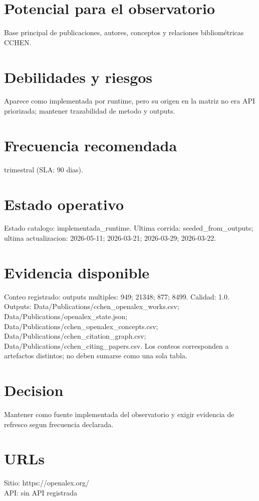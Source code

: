 \documentclass[10pt,a4paper]{article}
\begin{document}
\section*{Potencial para el observatorio}
Base principal de publicaciones, autores, conceptos y relaciones bibliométricas CCHEN.

\section*{Debilidades y riesgos}
Aparece como implementada por runtime, pero su origen en la matriz no era API priorizada; mantener trazabilidad de metodo y outputs.

\section*{Frecuencia recomendada}
trimestral (SLA: 90 dias).

\section*{Estado operativo}
Estado catalogo: implementada\_runtime. Ultima corrida: seeded\_from\_outputs; ultima actualizacion: 2026-05-11; 2026-03-21; 2026-03-29; 2026-03-22.

\section*{Evidencia disponible}
Conteo registrado: outputs multiples: 949; 21348; 877; 8499. Calidad: 1.0. Outputs: Data/Publications/cchen\_openalex\_works.csv; Data/Publications/openalex\_state.json; Data/Publications/cchen\_openalex\_concepts.csv; Data/Publications/cchen\_citation\_graph.csv; Data/Publications/cchen\_citing\_papers.csv. Los conteos corresponden a artefactos distintos; no deben sumarse como una sola tabla.

\section*{Decision}
Mantener como fuente implementada del observatorio y exigir evidencia de refresco segun frecuencia declarada.


\section*{URLs}
Sitio: https://openalex.org/\\
API: sin API registrada
\end{document}
